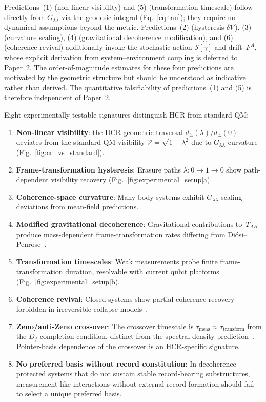 \documentclass[aps,prd,twocolumn,superscriptaddress,nofootinbib,floatfix]{revtex4-2}
\newcommand{\Sig}{\Sigma}
\newcommand{\Tab}{T_{AB}}
\newcommand{\Gll}{G_{\lambda\lambda}}
\newcommand{\HCR}{HCR}
\begin{document}
Predictions~(1) (non-linear visibility) and (5) (transformation timescale) follow directly from $\Gll$ via the geodesic integral (Eq.~\ref{eq:tau}); they require no dynamical assumptions beyond the metric. Predictions~(2) (hysteresis $\delta\mathcal{V}$), (3) (curvature scaling), (4) (gravitational decoherence modification), and (6) (coherence revival) additionally invoke the stochastic action $\mathcal{S}[\gamma]$ and drift~$F^A$, whose explicit derivation from system--environment coupling is deferred to Paper~2. The order-of-magnitude estimates for these four predictions are motivated by the geometric structure but should be understood as indicative rather than derived. The quantitative falsifiability of predictions~(1) and (5) is therefore independent of Paper~2.

Eight experimentally testable signatures distinguish \HCR{} from standard QM:
\begin{enumerate}
\item \textbf{Non-linear visibility}: the \HCR{} geometric traversal $d_\Sig(\lambda)/d_\Sig(0)$ deviates from the standard QM visibility $\mathcal{V} = \sqrt{1-\lambda^2}$ due to $\Gll$ curvature (Fig.~\ref{fig:cr_vs_standard}).
\item \textbf{Frame-transformation hysteresis}: Erasure paths $\lambda: 0 \to 1 \to 0$ show path-dependent visibility recovery (Fig.~\ref{fig:experimental_setup}a).
\item \textbf{Coherence-space curvature}: Many-body systems exhibit $\Gll$ scaling deviations from mean-field predictions.
\item \textbf{Modified gravitational decoherence}: Gravitational contributions to~$\Tab$ produce mass-dependent frame-transformation rates differing from Di\'osi--Penrose~\cite{diosiUniversalMasterEquation1987,penroseGravitysRoleQuantum1996}.
\item \textbf{Transformation timescales}: Weak measurements probe finite frame-transformation duration, resolvable with current qubit platforms (Fig.~\ref{fig:experimental_setup}b).
\item \textbf{Coherence revival}: Closed systems show partial coherence recovery forbidden in irreversible-collapse models~\cite{ghirardiUnifiedDynamicsMicroscopic1986,carlessoTestingLargescaleLimit2020}.
\item \textbf{Zeno/anti-Zeno crossover}: The crossover timescale is $\tau_{\mathrm{meas}} \approx \tau_{\mathrm{transform}}$ from the $D_f$ completion condition, distinct from the spectral-density prediction~\cite{KofmanKurizki2000}. Pointer-basis dependence of the crossover is an \HCR{}-specific signature.
\item \textbf{No preferred basis without record constitution}: In decoherence-protected systems that do not sustain stable record-bearing substructures, measurement-like interactions without external record formation should fail to select a unique preferred basis.
\end{enumerate}
\end{document}
